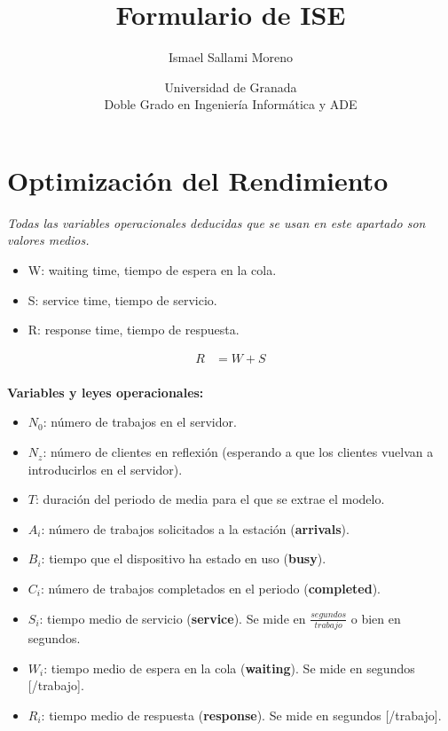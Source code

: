 \documentclass[a4paper,12pt]{article}
\title{\textbf{Formulario de ISE}}
\author{Ismael Sallami Moreno}
\date{\small Universidad de Granada\\ Doble Grado en Ingeniería Informática y ADE}
\begin{document}
\maketitle
\thispagestyle{fancy}

\vspace{1cm}

\section*{Optimización del Rendimiento}

\textit{Todas las variables operacionales deducidas que se usan en este apartado son valores medios.}

\begin{itemize}
    \item W: waiting time, tiempo de espera en la cola.
    \item S: service time, tiempo de servicio.
    \item R: response time, tiempo de respuesta.
\end{itemize}

\begin{tcolorbox}[colback=yellow!5!white, colframe=yellow!75!black]
    \begin{align*}
        R &= W + S \\
    \end{align*}
\end{tcolorbox}

\textbf{Variables y leyes operacionales:}

\begin{itemize}
    \item $N_0$: número de trabajos en el servidor.
    \item $N_z$: número de clientes en reflexión (esperando a que los clientes vuelvan a introducirlos en el servidor).
    \item $T$: duración del periodo de media para el que se extrae el modelo.
    \item $A_i$: número de trabajos solicitados a la estación (\textbf{arrivals}).
    \item $B_i$: tiempo que el dispositivo ha estado en uso (\textbf{busy}).
    \item $C_i$: número de trabajos completados en el periodo (\textbf{completed}).
    \item $S_i$: tiempo medio de servicio (\textbf{service}). Se mide en $\frac{segundos}{trabajo}$ o bien en segundos.
    \item $W_i$: tiempo medio de espera en la cola (\textbf{waiting}). Se mide en segundos [/trabajo].
    \item $R_i$: tiempo medio de respuesta (\textbf{response}). Se mide en segundos [/trabajo].


\end{itemize}
\end{document}
